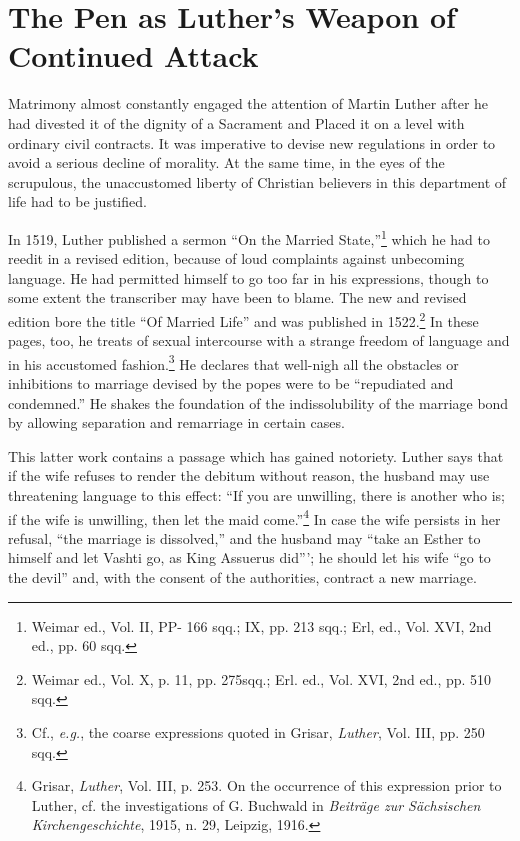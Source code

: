 \section{The Pen as Luther’s Weapon of Continued Attack}

Matrimony almost constantly engaged the attention of Martin
Luther after he had divested it of the dignity of a Sacrament and
Placed it on a level with ordinary civil contracts. It was imperative
to devise new regulations in order to avoid a serious decline of
morality. At the same time, in the eyes of the scrupulous, the unaccustomed
liberty of Christian believers in this department of life
had to be justified.

In 1519, Luther published a sermon “On the Married State,”\footnote
{Weimar ed., Vol. II, PP- 166 sqq.; IX, pp. 213 sqq.; Erl, ed., Vol. XVI, 2nd ed., pp.
60 sqq.}
which he had to reedit in a revised edition, because of loud complaints
against unbecoming language. He had permitted himself
to go too far in his expressions, though to some extent the transcriber
may have been to blame. The new and revised edition bore the title
“Of Married Life” and was published in 1522.\footnote
{Weimar ed., Vol. X, p. 11, pp. 275sqq.; Erl. ed., Vol. XVI, 2nd ed., pp. 510 sqq.}
In these pages,
too, he treats of sexual intercourse with a strange freedom of language
and in his accustomed fashion.\footnote
{Cf., \textit{e.g.}, the coarse expressions quoted in Grisar, \textit{Luther}, Vol. III, pp. 250 sqq.}
He declares that well-nigh all the
obstacles or inhibitions to marriage devised by the popes were to
be “repudiated and condemned.” He shakes the foundation of the
indissolubility of the marriage bond by allowing separation and remarriage
in certain cases.

This latter work contains a passage which has gained notoriety. Luther
says that if the wife refuses to render the debitum without reason, the
husband may use threatening language to this effect: “If you are unwilling,
there is another who is; if the wife is unwilling, then let the maid come.”\footnote
{Grisar, \textit{Luther}, Vol. III, p. 253. On the occurrence of this expression prior to Luther,
cf. the investigations of G. Buchwald in \textit{Beiträge zur Sächsischen Kirchengeschichte}, 1915,
n. 29, Leipzig, 1916.}
In case the wife persists in her refusal, “the marriage is dissolved,” and the
husband may “take an Esther to himself and let Vashti go, as King Assuerus
did”’; he should let his wife “go to the devil” and, with the consent of the
authorities, contract a new marriage.

